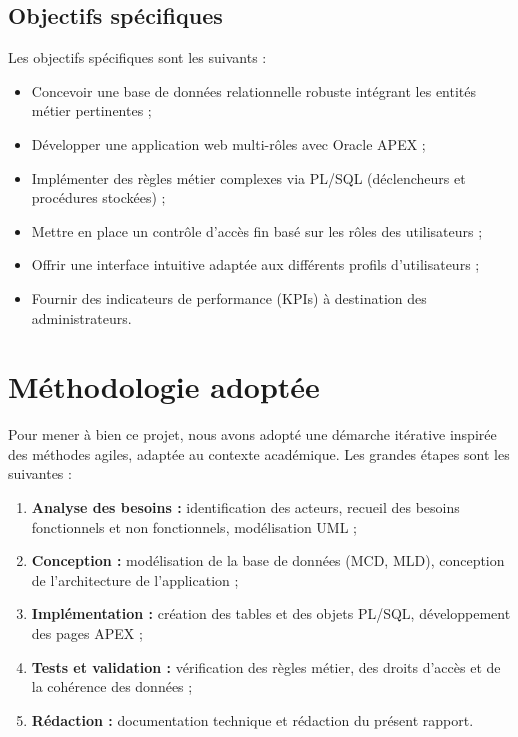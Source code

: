 \documentclass[12pt,a4paper,oneside]{report}
\begin{document}
\subsection{Objectifs spécifiques}

Les objectifs spécifiques sont les suivants :

\begin{itemize}[leftmargin=2em]
  \item Concevoir une base de données relationnelle robuste intégrant les entités métier pertinentes ;
  \item Développer une application web multi-rôles avec Oracle APEX ;
  \item Implémenter des règles métier complexes via PL/SQL (déclencheurs et procédures stockées) ;
  \item Mettre en place un contrôle d'accès fin basé sur les rôles des utilisateurs ;
  \item Offrir une interface intuitive adaptée aux différents profils d'utilisateurs ;
  \item Fournir des indicateurs de performance (KPIs) à destination des administrateurs.
\end{itemize}

\section{Méthodologie adoptée}

Pour mener à bien ce projet, nous avons adopté une démarche itérative inspirée des méthodes agiles, adaptée au contexte académique. Les grandes étapes sont les suivantes :

\begin{enumerate}[leftmargin=2em]
  \item \textbf{Analyse des besoins :} identification des acteurs, recueil des besoins fonctionnels et non fonctionnels, modélisation UML ;
  \item \textbf{Conception :} modélisation de la base de données (MCD, MLD), conception de l'architecture de l'application ;
  \item \textbf{Implémentation :} création des tables et des objets PL/SQL, développement des pages APEX ;
  \item \textbf{Tests et validation :} vérification des règles métier, des droits d'accès et de la cohérence des données ;
  \item \textbf{Rédaction :} documentation technique et rédaction du présent rapport.
\end{enumerate}
\end{document}
